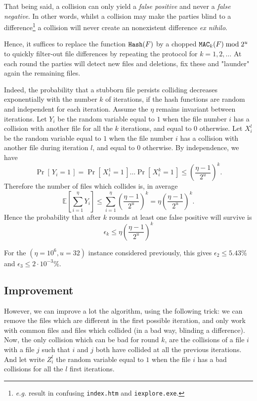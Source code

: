 \documentclass[11pt]{llncs}
\newcommand{\Prob}[1]{{\Pr\left[\,{#1}\,\right]}}
\newcommand{\EE}[1]{{\mathbb{E}\left[{#1}\right]}}
\begin{document}
That being said, a collision can only yield a {\sl false positive} and never a {\sl false negative}. In other words, whilst a collision may make the parties blind to a difference\footnote{{\sl e.g.} result in confusing {\tt index.htm} and {\tt iexplore.exe}.} a collision will never create an nonexistent difference {\sl ex nihilo}.\smallskip

Hence, it suffices to replace the function $\mbox{{\tt Hash}}(F)$ by a chopped $\mbox{{\tt MAC}}_k(F) \bmod 2^u$ to quickly filter-out file differences by repeating the protocol for $k=1,2,\ldots$ At each round the parties will detect new files and deletions, fix these and "launder" again the remaining files.\smallskip

Indeed, the probability that a stubborn file persists colliding decreases exponentially with the number $k$ of iterations, if the hash functions are random and independent for each iteration.
Assume the $\eta$ remains invariant between iterations.
Let $Y_i$ be the random variable equal to $1$ when the file number $i$ has a collision with another file for all the $k$ iterations, and equal to $0$ otherwise.
Let $X^l_i$ be the random variable equal to $1$ when the file number $i$ has a collision with another file during iteration $l$, and equal to $0$ otherwise.
By independence, we have
 \[ \Prob{Y_i = 1} = \Prob{X^1_i = 1} \dots \Prob{X^k_i = 1} \le \left( \frac{\eta -1}{2^u} \right)^k. \] 
Therefore the number of files which collides is, in average
\[
 \EE{\sum_{i=1}^{\eta} Y_i} \le \sum_{i=1}^\eta \left( \frac{\eta -1}{2^u} \right)^k =  \eta \left(\frac{\eta - 1}{2^u}\right)^k.
\]
Hence the probability that after $k$ rounds at least one false positive will survive is
\[
\epsilon_k \le \eta \left(\frac{\eta - 1}{2^u}\right)^k
\]

For the $(\eta=10^6,u=32)$ instance considered previously, this gives $\epsilon_2 \le 5.43\%$ and $\epsilon_3 \le 2 \cdot 10^{-3} \%$.

\subsection{Improvement}

However, we can improve a lot the algorithm, using the following trick: we can remove the files which are different in the first possible iteration, and only work with common files and files which collided (in a bad way, blinding a difference).
Now, the only collision which can be bad for round $k$, are the collisions of a file $i$ with a file $j$ such that $i$ and $j$ both have collided at all the previous iterations.
And let write $Z^l_i$ the random variable equal to $1$ when the file $i$ has a bad collisions for all the $l$ first iterations.
\end{document}
